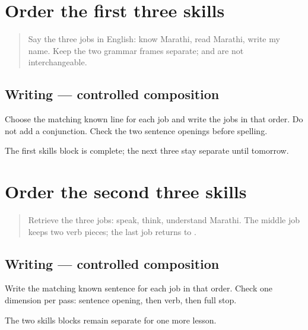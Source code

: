 \section[first skills block]{Order the first three skills}

\label{lesson:MR-A1M14-skills-block-one}



\begin{quote}
Say the three jobs in English: know Marathi, read Marathi, write my name. Keep the two grammar frames separate; \textbf{} and \textbf{} are not interchangeable.
\end{quote}

\subsection*{Writing — controlled composition}
Choose the matching known line for each job and write the jobs in that order. Do not add a conjunction. Check the two sentence openings before spelling.

\begin{tcolorbox}[breakable,colback=teal!4,colframe=teal!35!black,title={Before you move on}]
The first skills block is complete; the next three stay separate until tomorrow.
\end{tcolorbox}
\section[second skills block]{Order the second three skills}

\label{lesson:MR-A1M15-skills-block-two}



\begin{quote}
Retrieve the three jobs: speak, think, understand Marathi. The middle job keeps two verb pieces; the last job returns to \textbf{}.
\end{quote}

\subsection*{Writing — controlled composition}
Write the matching known sentence for each job in that order. Check one dimension per pass: sentence opening, then verb, then full stop.

\begin{tcolorbox}[breakable,colback=teal!4,colframe=teal!35!black,title={Before you move on}]
The two skills blocks remain separate for one more lesson.
\end{tcolorbox}
